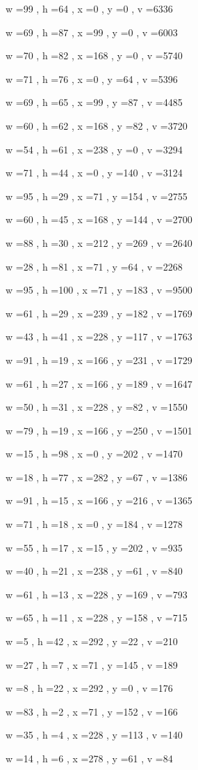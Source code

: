 \documentclass[11pt]{article}
\begin{document}
w =99 , h =64 , x =0 , y =0 , v =6336
\par
w =69 , h =87 , x =99 , y =0 , v =6003
\par
w =70 , h =82 , x =168 , y =0 , v =5740
\par
w =71 , h =76 , x =0 , y =64 , v =5396
\par
w =69 , h =65 , x =99 , y =87 , v =4485
\par
w =60 , h =62 , x =168 , y =82 , v =3720
\par
w =54 , h =61 , x =238 , y =0 , v =3294
\par
w =71 , h =44 , x =0 , y =140 , v =3124
\par
w =95 , h =29 , x =71 , y =154 , v =2755
\par
w =60 , h =45 , x =168 , y =144 , v =2700
\par
w =88 , h =30 , x =212 , y =269 , v =2640
\par
w =28 , h =81 , x =71 , y =64 , v =2268
\par
w =95 , h =100 , x =71 , y =183 , v =9500
\par
w =61 , h =29 , x =239 , y =182 , v =1769
\par
w =43 , h =41 , x =228 , y =117 , v =1763
\par
w =91 , h =19 , x =166 , y =231 , v =1729
\par
w =61 , h =27 , x =166 , y =189 , v =1647
\par
w =50 , h =31 , x =228 , y =82 , v =1550
\par
w =79 , h =19 , x =166 , y =250 , v =1501
\par
w =15 , h =98 , x =0 , y =202 , v =1470
\par
w =18 , h =77 , x =282 , y =67 , v =1386
\par
w =91 , h =15 , x =166 , y =216 , v =1365
\par
w =71 , h =18 , x =0 , y =184 , v =1278
\par
w =55 , h =17 , x =15 , y =202 , v =935
\par
w =40 , h =21 , x =238 , y =61 , v =840
\par
w =61 , h =13 , x =228 , y =169 , v =793
\par
w =65 , h =11 , x =228 , y =158 , v =715
\par
w =5 , h =42 , x =292 , y =22 , v =210
\par
w =27 , h =7 , x =71 , y =145 , v =189
\par
w =8 , h =22 , x =292 , y =0 , v =176
\par
w =83 , h =2 , x =71 , y =152 , v =166
\par
w =35 , h =4 , x =228 , y =113 , v =140
\par
w =14 , h =6 , x =278 , y =61 , v =84
\par
\newpage
\end{document}
